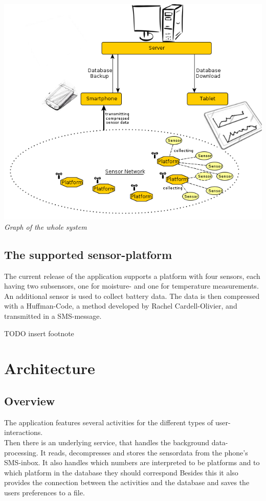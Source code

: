 \documentclass[11pt,oneside,a4paper]{scrartcl}
\begin{document}
\begin{center}
\includegraphics[scale=0.6]{picture/general_buildup.png}\\
\textit{Graph of the whole system}
\end{center}

\subsection{The supported sensor-platform}
The current release of the application supports a platform with four sensors, each having two subsensors, one for moisture- and one for temperature measurements. An additional sensor is used to collect battery data. The data is then compressed with a Huffman-Code, a method developed by Rachel Cardell-Olivier, and transmitted in a SMS-message.


TODO insert footnote

\section{Architecture}
\subsection{Overview}
The application features several activities for the different types of user-interactions. \\
Then there is an underlying service, that handles the background data-processing. It reads, decompresses and stores the sensordata from the phone's SMS-inbox. It also handles which numbers are interpreted to be platforms and to which platform in the database they should correspond Besides this it also provides the connection between the activities and the database and saves the users preferences to a file.
\end{document}

